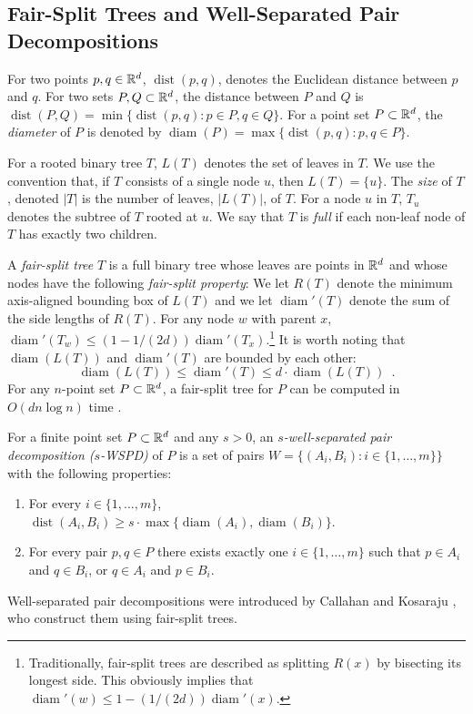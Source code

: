 \documentclass{patmorin}
\DeclareMathOperator{\diam}{diam}
\DeclareMathOperator{\dist}{dist}
\begin{document}
\subsection{Fair-Split Trees and Well-Separated Pair Decompositions}

For two points $p,q\in\mathbb{R}^d$, $\dist(p,q)$, denotes the Euclidean distance
between $p$ and $q$. For two sets $P,Q\subset\mathbb{R}^d$, the distance between
$P$ and $Q$ is $\dist(P,Q)=\min\{\dist(p,q):p\in P, q\in Q\}$.  For a
point set $P\subset\mathbb{R}^d$, the \emph{diameter} of $P$ is denoted by
$\diam(P)=\max\{\dist(p,q):p,q\in P\}$.

For a rooted binary tree $T$, $L(T)$ denotes the set of leaves in
$T$. We use the convention that, if $T$ consists of a single node $u$,
then $L(T)=\{u\}$. The \emph{size} of $T$, denoted $|T|$ is the number of
leaves, $|L(T)|$, of $T$. For a node $u$ in $T$, $T_u$ denotes the subtree
of $T$ rooted at $u$.  We say that $T$ is \emph{full} if each non-leaf
node of $T$ has exactly two children.

A \emph{fair-split tree} $T$ is a full binary tree whose leaves are
points in $\mathbb{R}^d$ and whose nodes have the following \emph{fair-split
property}: We let $R(T)$ denote the minimum axis-aligned bounding
box of $L(T)$ and we let $\diam'(T)$ denote the sum of the side
lengths of $R(T)$.  For any node $w$ with parent $x$, $\diam'(T_w)
\le (1-1/(2d))\diam'(T_x)$.\footnote{Traditionally, fair-split trees
are described as splitting $R(x)$ by bisecting its longest side.
This obviously implies that $\diam'(w)\le 1-(1/(2d))\diam'(x)$.} It is
worth noting that $\diam(L(T))$ and $\diam'(T)$ are bounded by each other:
\[
	\diam(L(T)) \le \diam'(T) \le d\cdot\diam(L(T)) \enspace .
\]	
For any $n$-point set $P\subset\mathbb{R}^d$, a fair-split tree for $P$ can be
computed in $O(dn\log n)$ time \cite{callahan.kosaraju:decomposition}.

For a finite point set $P\subset\mathbb{R}^d$ and any $s>0$, an
\emph{$s$-well-separated pair decomposition ($s$-WSPD)} of $P$ is a set of pairs
$W=\{(A_i,B_i):i\in\{1,\ldots,m\}\}$ with the following properties:
\begin{enumerate}
  \item For every $i\in\{1,\ldots,m\}$, 
    $\dist(A_i,B_i)\ge s\cdot\max\{\diam(A_i),\diam(B_i)\}$.
  \item For every pair $p,q\in P$ there exists exactly one
    $i\in\{1,\ldots,m\}$ such that $p\in A_i$ and $q\in B_i$, or $q\in A_i$
    and $p\in B_i$.
\end{enumerate}
Well-separated pair decompositions were introduced by Callahan and
Kosaraju \cite{callahan.kosaraju:decomposition}, who construct them
using fair-split trees.
\end{document}
